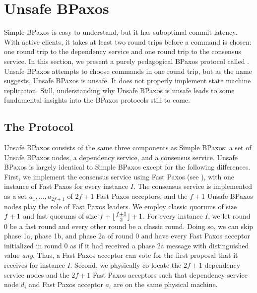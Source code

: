 \section{Unsafe BPaxos}
Simple BPaxos is easy to understand, but it has suboptimal commit latency.
With active clients, it takes at least two round trips before a command is
chosen: one round trip to the dependency service and one round trip to the
consensus service. In this section, we present a purely pedagogical BPaxos
protocol called . Unsafe BPaxos attempts to choose
commands in one round trip, but as the name suggests, Unsafe BPaxos is unsafe.
It does not properly implement state machine replication. Still, understanding
why Unsafe BPaxos is unsafe leads to some fundamental insights into the BPaxos
protocols still to come.

\subsection{The Protocol}
Unsafe BPaxos consists of the same three components as Simple BPaxos: a set of
Unsafe BPaxos nodes, a dependency service, and a consensus service. Unsafe
BPaxos is largely identical to Simple BPaxos except for the following
differences.
%
First, we implement the consensus service using Fast Paxos (see
), with one instance of Fast Paxos for every instance
$I$. The consensus service is implemented as a set $a_1, \ldots, a_{2f + 1}$ of
$2f + 1$ Fast Paxos acceptors, and the $f + 1$ Unsafe BPaxos nodes play the
role of Fast Paxos leaders. We employ classic quorums of size $f + 1$ and
fast quorums of size $f + \lfloor\frac{f + 1}{2}\rfloor + 1$. For every instance $I$, we let round
$0$ be a fast round and every other round be a classic round. Doing so, we can
skip phase 1a, phase 1b, and phase 2a of round $0$ and have every Fast Paxos
acceptor initialized in round $0$ as if it had received a phase 2a message with
distinguished value \emph{any}. Thus, a Fast Paxos acceptor can vote for the
first proposal that it receives for instance $I$.
%
Second, we physically co-locate the $2f + 1$ dependency service nodes and the
$2f + 1$ Fast Paxos acceptors such that dependency service node $d_i$ and Fast
Paxos acceptor $a_i$ are on the same physical machine.

